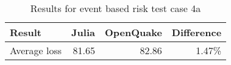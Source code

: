 \begin{table}[htbp]

\centering
\begin{tabular}{ l r r r }

\hline
\rowcolor{anti-flashwhite}
\bf{Result} & \bf{Julia} & \bf{OpenQuake} & \bf{Difference}\\
\hline
Average loss & 81.65 & 82.86 & 1.47\% \\
\hline
\end{tabular}

\caption{Results for event based risk test case 4a}
\label{tab:result-ebr-4a}
\end{table}